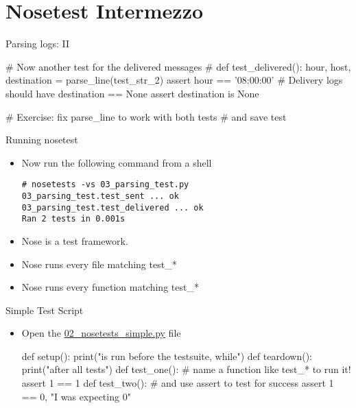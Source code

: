 \section{Nosetest Intermezzo}


\begin{pyframe}{Parsing logs: II}
\begin{pycode}
# Now another test for the delivered messages
#  %
def test_delivered():
    hour, host, destination = parse_line(test_str_2)
    assert hour == '08:00:00'
    # Delivery logs should have destination == None
    assert destination is None

# Exercise: fix parse_line to work with both tests
#  and save test
\end{pycode}
\end{pyframe}


\begin{pyframe}{Running nosetest}
\begin{itemize}
\item Now run the following command from a shell

\begin{verbatim}
# nosetests -vs 03_parsing_test.py  
03_parsing_test.test_sent ... ok        
03_parsing_test.test_delivered ... ok 
Ran 2 tests in 0.001s                 
\end{verbatim}
\item Nose is a test framework.
\item Nose runs every file matching test\_*
\item Nose runs every function matching test\_*
\end{itemize}
\end{pyframe}

\begin{pyframe}{Simple Test Script}
\begin{itemize}
\item Open the \href{https://github.com/ioggstream/python-course/blob/master/python-for-sysadmin/02\_nosetests\_simple.py}{02\_nosetests\_simple.py} file
\begin{pycode}
def setup():
    print("is run before the testsuite, while")
def teardown():
    print("after all tests")
def test_one():
    # name a function like test_* to run it!
    assert 1 == 1 
def test_two():
    # and use assert to test for success
    assert 1 == 0, "I was expecting 0" 
\end{pycode}
\end{itemize}
\end{pyframe}

